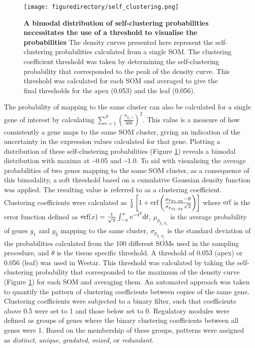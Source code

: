 \documentclass[12pt,]{book}
\begin{document}
\begin{figure}[htbp]
\centering
\texttt{[image: figuredirectory/self\_clustering.png]}
\caption{\textbf{A bimodal distribution of self-clustering probabilities
necessitates the use of a threshold to visualise the probabilities} The
density curves presented here represent the self-clustering
probabilities calculated from a single SOM. The clustering coefficient
threshold was taken by determining the self-clustering probability that
corresponded to the peak of the density curve. This threshold was
calculated for each SOM and averaged to give the final thresholds for
the apex (0.053) and the leaf (0.056).}\label{figure:methods:bimodal}
\end{figure}

The probability of mapping to the same cluster can also be calculated
for a single gene of interest by calculating
\(\sum_{c=1}^{S}\left (\frac{n_{g_{1}, c}}{500} \right )^2\). This value
is a measure of how consistently a gene maps to the same SOM cluster,
giving an indication of the uncertainty in the expression values
calculated for that gene. Plotting a distribution of these
self-clustering probabilities (Figure \ref{figure:methods:bimodal})
reveals a bimodal distribution with maxima at \textasciitilde{}0.05 and
\textasciitilde{}1.0. To aid with visualising the average probabilities
of two genes mapping to the same SOM cluster, as a consequence of this
bimodality, a soft threshold based on a cumulative Gaussian density
function was applied. The resulting value is referred to as a clustering
coefficient. Clustering coefficients were calculated as
\(\frac{1}{2} \left [1 + \textup{erf} \left ( \frac{\mu_{p_{g_1,g_2}} - \theta}{\sigma_{p_{g_1,g_2}}\sqrt{2}} \right ) \right ]\)
where \(\textup{erf}\) is the error function defined as
\(\textup{erf}(x) = \frac{1}{\sqrt{\pi}}\int_{-x}^{x}e^{-t^2}\textup{d}t\),
\(\mu_{p_{g_1,g_2}}\) is the average probability of genes \(g_1\) and
\(g_2\) mapping to the same cluster, \(\sigma_{p_{g_1,g_2}}\) is the
standard deviation of the probabilities calculated from the 100
different SOMs used in the sampling procedure, and \(\theta\) is the
tissue specific threshold. A threshold of 0.053 (apex) or 0.056 (leaf)
was used in Westar. This threshold was calculated by taking the
self-clustering probability that corresponded to the maximum of the
density curve (Figure \ref{figure:methods:bimodal}) for each SOM and
averaging them. An automated approach was taken to quantify the pattern
of clustering coefficients between copies of the same gene. Clustering
coefficients were subjected to a binary filter, such that coefficients
above 0.5 were set to 1 and those below set to 0. Regulatory modules
were defined as groups of genes where the binary clustering coefficients
between all genes were 1. Based on the membership of these groups,
patterns were assigned as \emph{distinct}, \emph{unique},
\emph{gradated}, \emph{mixed}, or \emph{redundant}.
\end{document}
